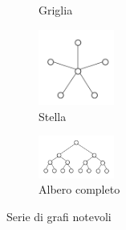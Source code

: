 \begin{figure}[h!]
\begin{subfigure}{.3\textwidth}
        \vspace{-5pt}
        \caption{Griglia}
    \end{subfigure}
    \hfill
    \begin{subfigure}{.3\textwidth}
        \centering
        \includegraphics[width=2.5cm]{images/stella.png}
        \vspace{-5pt}
        \caption{Stella}
    \end{subfigure}
    \hfill
    \begin{subfigure}{.3\textwidth}
        \centering
        \includegraphics[width=2.5cm]{images/albero-completo.png}
        \vspace{-5pt}
        \caption{Albero completo}
    \end{subfigure}
    \vspace{5pt}
    \caption{Serie di grafi notevoli}
\end{figure}